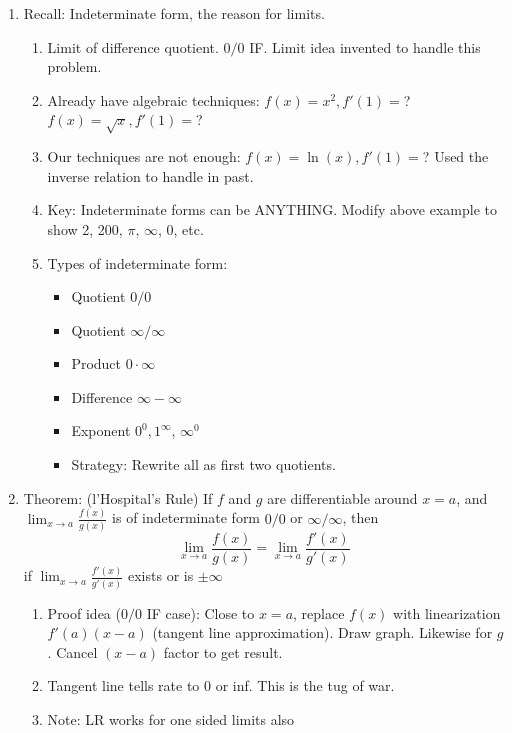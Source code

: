 \documentclass{article}
\begin{document}
\begin{enumerate}
\item Recall: Indeterminate form, the reason for limits.
\begin{enumerate}
\item Limit of difference quotient. $0/0$ IF. Limit idea invented to handle this problem. 
\item Already have algebraic techniques: $f(x)=x^2, f'(1)=$? $f(x)=\sqrt{x}, f'(1)=$?
\item Our techniques are not enough: $f(x)=\ln(x), f'(1)=$? Used the inverse relation to handle in past. 
\item Key: Indeterminate forms can be ANYTHING. Modify above example to show 2, 200, $\pi$, $\infty$, 0, etc.
\item Types of indeterminate form:
\begin{itemize}
\item Quotient $0/0$
\item Quotient $\infty/\infty$
\item Product $0\cdot \infty$
\item Difference $\infty-\infty$
\item Exponent $0^0, 1^\infty$, $\infty^0$
\item Strategy: Rewrite all as first two quotients.
\end{itemize}
\end{enumerate}

\item Theorem: (l'Hospital's Rule) If $f$ and $g$ are differentiable around $x=a$, and $\displaystyle\lim_{x\rightarrow a} \frac{f(x)}{g(x)}$ is of indeterminate form $0/0$ or $\infty/\infty$, then
$$
\lim_{x\rightarrow a} \frac{f(x)}{g(x)} = \lim_{x\rightarrow a} \frac{f'(x)}{g'(x)}
$$
if $\displaystyle\lim_{x\rightarrow a} \frac{f'(x)}{g'(x)}$ exists or is $\pm\infty$

\begin{enumerate}
\item Proof idea ($0/0$ IF case): Close to $x=a$, replace $f(x)$ with linearization $f'(a)(x-a)$ (tangent line approximation). Draw graph. Likewise for $g$. Cancel $(x-a)$ factor to get result.
\item Tangent line tells rate to 0 or inf. This is the tug of war.
\item Note: LR works for one sided limits also
\end{enumerate}


\end{enumerate}
\end{document}
